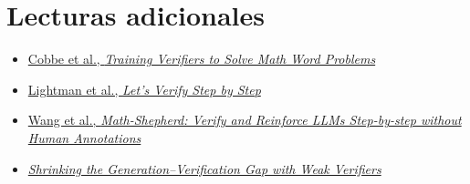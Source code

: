 \section{Lecturas adicionales}

\begin{itemize}
    \item \href{https://arxiv.org/abs/2110.14168}{Cobbe et al., \emph{Training Verifiers to Solve Math Word Problems}}
    \item \href{https://arxiv.org/abs/2305.20050}{Lightman et al., \emph{Let's Verify Step by Step}}
    \item \href{https://arxiv.org/abs/2312.08935}{Wang et al., \emph{Math-Shepherd: Verify and Reinforce LLMs Step-by-step without Human Annotations}}
    \item \href{https://arxiv.org/abs/2506.18203}{\emph{Shrinking the Generation--Verification Gap with Weak Verifiers}}
\end{itemize}

